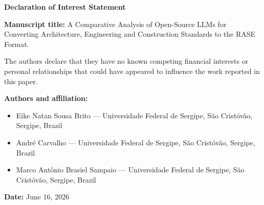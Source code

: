 \documentclass[11pt]{article}
\begin{document}
\begin{center}
{\Large \textbf{Declaration of Interest Statement}}
\end{center}

\bigskip
\noindent \textbf{Manuscript title:} A Comparative Analysis of Open-Source LLMs
for Converting Architecture, Engineering and Construction Standards to the RASE
Format.

\bigskip
\noindent The authors declare that they have no known competing financial
interests or personal relationships that could have appeared to influence the
work reported in this paper.

\bigskip
\noindent \textbf{Authors and affiliation:}
\begin{itemize}
  \item Eike Natan Sousa Brito --- Universidade Federal de Sergipe, S\~ao
        Crist\'ov\~ao, Sergipe, Brazil
  \item Andr\'e Carvalho --- Universidade Federal de Sergipe, S\~ao
        Crist\'ov\~ao, Sergipe, Brazil
  \item Marco Ant\^onio Brasiel Sampaio --- Universidade Federal de Sergipe,
        S\~ao Crist\'ov\~ao, Sergipe, Brazil
\end{itemize}

\bigskip
\noindent \textbf{Date:} June 16, 2026
\end{document}
